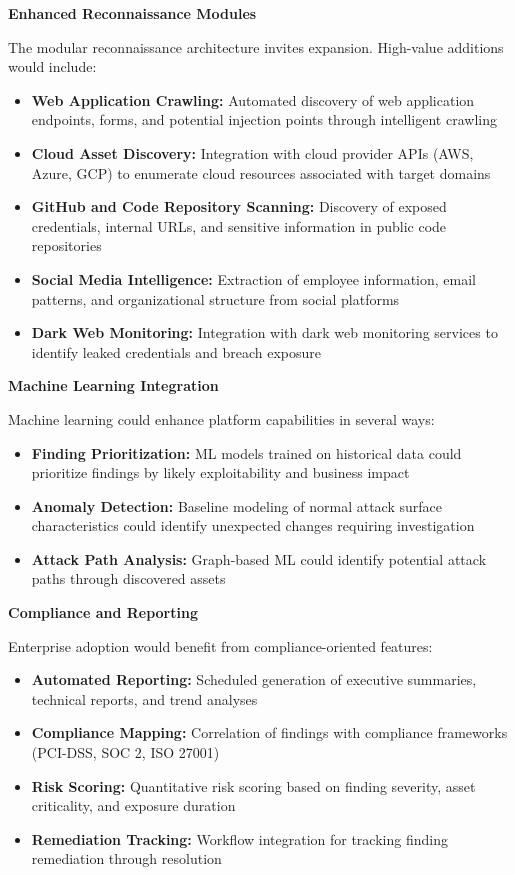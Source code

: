 \documentclass[a4paper,12pt]{report}
\begin{document}
\textbf{Enhanced Reconnaissance Modules}\hfill \break

The modular reconnaissance architecture invites expansion. High-value additions would include:

\begin{itemize}
\item \textbf{Web Application Crawling:} Automated discovery of web application endpoints, forms, and potential injection points through intelligent crawling
\item \textbf{Cloud Asset Discovery:} Integration with cloud provider APIs (AWS, Azure, GCP) to enumerate cloud resources associated with target domains
\item \textbf{GitHub and Code Repository Scanning:} Discovery of exposed credentials, internal URLs, and sensitive information in public code repositories
\item \textbf{Social Media Intelligence:} Extraction of employee information, email patterns, and organizational structure from social platforms
\item \textbf{Dark Web Monitoring:} Integration with dark web monitoring services to identify leaked credentials and breach exposure
\end{itemize}

\textbf{Machine Learning Integration}\hfill \break

Machine learning could enhance platform capabilities in several ways:

\begin{itemize}
\item \textbf{Finding Prioritization:} ML models trained on historical data could prioritize findings by likely exploitability and business impact
\item \textbf{Anomaly Detection:} Baseline modeling of normal attack surface characteristics could identify unexpected changes requiring investigation
\item \textbf{Attack Path Analysis:} Graph-based ML could identify potential attack paths through discovered assets
\end{itemize}

\textbf{Compliance and Reporting}\hfill \break

Enterprise adoption would benefit from compliance-oriented features:

\begin{itemize}
\item \textbf{Automated Reporting:} Scheduled generation of executive summaries, technical reports, and trend analyses
\item \textbf{Compliance Mapping:} Correlation of findings with compliance frameworks (PCI-DSS, SOC 2, ISO 27001)
\item \textbf{Risk Scoring:} Quantitative risk scoring based on finding severity, asset criticality, and exposure duration
\item \textbf{Remediation Tracking:} Workflow integration for tracking finding remediation through resolution
\end{itemize}
\end{document}
